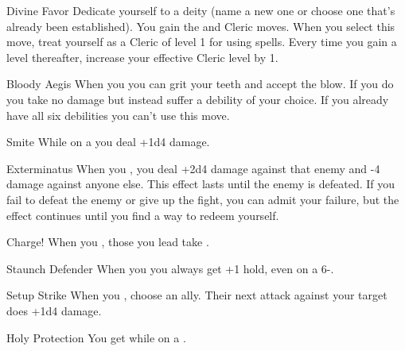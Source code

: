 \documentclass[8pt]{extarticle}
\begin{document}

\begin{multicols}{2}

\firstAdvances

\begin{amove}{Divine Favor}
  Dedicate yourself to a deity (name a new one or choose one that’s
  already been established). You gain the  and
   Cleric moves. When you select this move, treat
  yourself as a Cleric of level 1 for using spells. Every time you
  gain a level thereafter, increase your effective Cleric level by 1.
\end{amove}

\begin{amove}{Bloody Aegis}
  When you  you can grit your teeth and accept
  the blow. If you do you take no damage but instead suffer a debility
  of your choice. If you already have all six debilities you can’t use
  this move.
\end{amove}

\begin{amove}{Smite}
  While on a  you deal +1d4 damage.
\end{amove}

\begin{amove}{Exterminatus}
  When you ,
  you deal +2d4 damage against that enemy and -4 damage against anyone
  else. This effect lasts until the enemy is defeated. If you fail to
  defeat the enemy or give up the fight, you can admit your failure,
  but the effect continues until you find a way to redeem yourself.
\end{amove}

\begin{amove}{Charge!}
  When you , those you lead
  take .
\end{amove}

\begin{amove}{Staunch Defender}
  When you  you always get +1 hold, even on a 6-.
\end{amove}

\begin{amove}{Setup Strike}
  When you , choose an ally. Their next attack
  against your target does +1d4 damage.
\end{amove}

\begin{amove}{Holy Protection}
  You get  while on a .
\end{amove}


\end{multicols}
\end{document}
